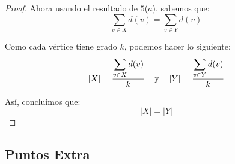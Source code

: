 \documentclass{article}
\begin{document}
\begin{enumerate}
\begin{enumerate}
\begin{proof}
      Ahora usando el resultado de $5$($a$), sabemos que:
      $$\sum_{v \in X} d(v) = \sum_{v \in Y} d(v)$$

      Como cada v\'ertice tiene grado $k$, podemos hacer lo siguiente:
      $$\abs{X} = \frac{\displaystyle \sum_{v \in X} d(v)}{k} \text{\hspace{0.3cm}
        \text{y} \hspace{0.3cm}} \abs{Y} = \frac{\displaystyle \sum_{v \in Y} d(v)}{k}$$

      As\'i, concluimos que:
      $$|X| = |Y|$$
    \end{proof}
  \end{enumerate}
\end{enumerate}

\subsection*{Puntos Extra}
\end{document}

